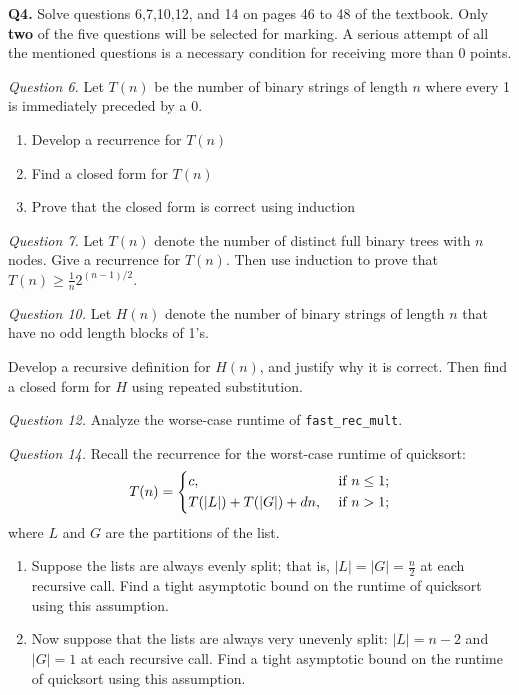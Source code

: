 \documentclass[11pt]{article}
\begin{document}
    \pagebreak
    \textbf{Q4.} Solve questions 6,7,10,12, and 14 on pages 46 to 48 of the textbook. Only \textbf{two} of the five questions will be selected for marking. A serious attempt of all the mentioned questions is a necessary condition for receiving more than 0 points.

    \textit{Question 6.} Let \(T(n)\) be the number of binary strings of length \(n\) where every 1 is immediately preceded by a 0.
    \begin{enumerate}[label=(\alph*)]
        \item Develop a recurrence for \(T(n)\)
        \item Find a closed form for \(T(n)\) 
        \item Prove that the closed form is correct using induction
    \end{enumerate}

    \textit{Question 7.} Let \(T(n)\) denote the number of distinct full binary trees with \(n\) nodes. Give a recurrence for \(T(n)\). Then use induction to prove that \(T(n)\geq \frac{1}{n}2^{(n-1) / 2}\).

    \textit{Question 10.} Let \(H(n)\) denote the number of binary strings of length \(n\) that have no odd length blocks of 1's.

    Develop a recursive definition for \(H(n)\), and justify why it is correct. Then find a closed form for \(H\) using repeated substitution.

    \textit{Question 12.} Analyze the worse-case runtime of \verb|fast_rec_mult|.

    \textit{Question 14.} Recall the recurrence for the worst-case runtime of quicksort:
    \[
        T(n)=\begin{dcases}
            c, &\text{ if } n\leq 1;\\
            T(|L|)+T(|G|) + dn, &\text{ if } n>1;\\
        \end{dcases}
    \]
    where \(L\) and \(G\) are the partitions of the list.
    \begin{enumerate}
        \item Suppose the lists are always evenly split; that is, \(|L| = |G| = \frac{n}{2}\) at each recursive call. Find a tight asymptotic bound on the runtime of quicksort using this assumption.
        \item Now suppose that the lists are always very unevenly split: \(|L| = n-2\) and \(|G| = 1\) at each recursive call. Find a tight asymptotic bound on the runtime of quicksort using this assumption.
    \end{enumerate}
\end{document}
